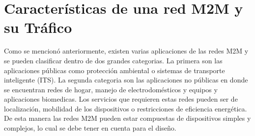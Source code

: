 \documentclass[journal]{IEEEtran}
\begin{document}
%



\section{Características de una red M2M y su Tráfico}

Como se mencion\'o anteriormente, existen varias aplicaciones de las redes M2M y se pueden clasificar dentro de dos grandes categorias. La primera son las aplicaciones p\'ublicas como protecci\'on ambiental o sistemas de transporte inteligente (ITS). La segunda categoria son las aplicaciones no p\'ublicas en donde se encuentran redes de hogar, manejo de electrodom\'esticos y equipos y aplicaciones biomedicas. Los servicios que requieren estas redes pueden ser de localizaci\'on, mobilidad de los dispositivos o restricciones de eficiencia energ\'etica. De esta manera las redes M2M pueden estar compuestas de dispositivos simples y complejos, lo cual se debe tener en cuenta para el diseño.\\
\end{document}
